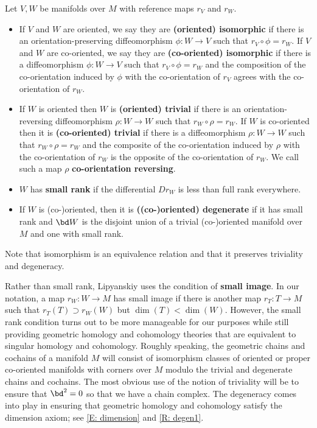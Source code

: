\begin{definition}\label{D: equiv triv and small}
	Let $V, W$ be manifolds over $M$ with reference maps $r_V$ and $r_W$.
	\begin{itemize}
		\item If $V$ and $W$ are oriented, we say they are \textbf{(oriented) isomorphic} if there is an orientation-preserving diffeomorphism $\phi \colon W \to V$ such that $r_V \circ \phi = r_W$.
		If $V$ and $W$ are co-oriented, we say they are \textbf{(co-oriented) isomorphic} if there is a diffeomorphism $\phi \colon W \to V$ such that $r_V \circ \phi = r_W$ and the composition of the
		co-orientation induced by $\phi$
		with the co-orientation of $r_V$ agrees with the co-orientation of $r_W$.

		\item If $W$ is oriented then $W$ is \textbf{(oriented) trivial} if there is an orientation-reversing diffeomorphism $\rho \colon W \to W$ such that $r_W \circ \rho = r_W$.
		If $W$ is co-oriented then it is \textbf{(co-oriented) trivial} if there is a diffeomorphism $\rho \colon W \to W$ such that $r_W \circ \rho = r_W$ and the composite of the co-orientation induced by $\rho$ with the co-orientation of $r_W$ is the opposite of the co-orientation of $r_W$.
		We call such a map $\rho$ \textbf{co-orientation reversing}.

		\item $W$ has \textbf{small rank} if the differential $D r_W$ is less than full rank everywhere.
		\item If $W$ is (co-)oriented, then it is \textbf{((co-)oriented) degenerate} if it has small rank and ${\bd W}$ is the disjoint union of a trivial (co-)oriented manifold over $M$ and one with small rank.
	\end{itemize}
\end{definition}

Note that isomorphism is an equivalence relation and that it preserves triviality and degeneracy.

Rather than small rank, Lipyanskiy uses the condition of \textbf{small image}.
In our notation, a map $r_W \colon W \to M$ has small image if there is another map $r_T \colon T \to M$ such that $r_T(T)\supset r_W(W)$ but $\dim(T)<\dim(W)$.
However, the small rank condition turns out to be more manageable for our purposes while still providing geometric homology and cohomology theories that are equivalent to singular homology and cohomology.
Roughly speaking, the geometric chains and cochains of a manifold $M$ will consist of isomorphism classes of oriented or proper co-oriented manifolds with corners over $M$ modulo the trivial and degenerate chains and cochains.
The most obvious use of the notion of triviality will be to ensure that $\bd^2 = 0$ so that we have a chain complex.
The degeneracy comes into play in ensuring that geometric homology and cohomology satisfy the dimension axiom; see \cref{E: dimension} and \cref{R: degen1}.

